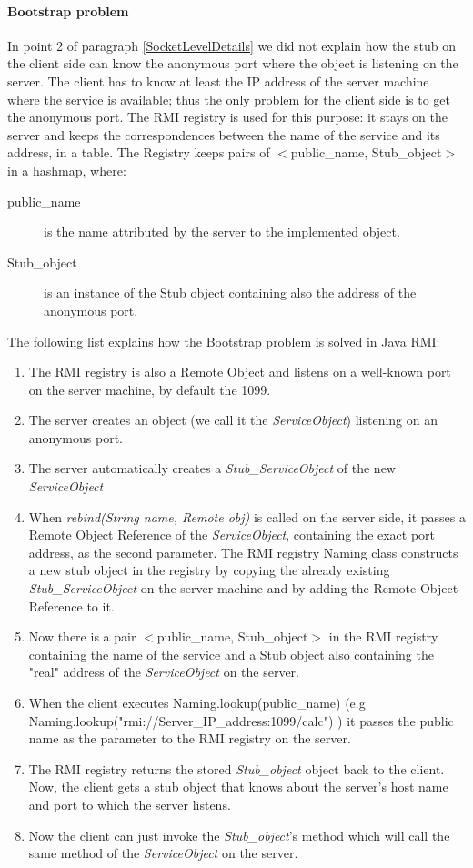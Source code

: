 \paragraph{Bootstrap problem}
\label{BootstrapProblem}
In point 2 of paragraph \ref{SocketLevelDetails} we did not explain how the stub on the client side can know the anonymous port where the object is listening on the server. The client has to know at least the IP address of the server machine where the service is available; thus the only problem for the client side is to get the anonymous port.
The RMI registry is used for this purpose: it stays on the server and keeps the correspondences between the name of the service and its address, in a table.
The Registry keeps pairs of $<$public\_name, Stub\_object$>$ in a hashmap, where:
\begin{description}
\item [public\_name] is the name attributed by the server to the implemented object.
\item [Stub\_object] is an instance of the Stub object containing also the address of the anonymous port. 
\end{description}

The following list explains how the Bootstrap problem is solved in Java RMI:
\begin{enumerate}
\item The RMI registry is also a Remote Object and listens on a well-known port on the server machine, by default the 1099.
\item The server creates an object (we call it the \textit{ServiceObject}) listening on an anonymous port.
\item The server automatically creates a \textit{Stub\_ServiceObject} of the new \textit{ServiceObject}
\item When \textit{rebind(String name, Remote obj)} is called on the server side, it passes a Remote Object Reference of the \textit{ServiceObject}, containing the exact port address, as the second parameter. The RMI registry Naming class constructs a new stub object in the registry by copying the already existing \textit{Stub\_ServiceObject} on the server machine and by adding the Remote Object Reference to it.
\item Now there is a pair $<$public\_name, Stub\_object$>$ in the RMI registry containing the name of the service and a Stub object also containing the "real" address of the \textit{ServiceObject} on the server.
\item When the client executes Naming.lookup(public\_name) (e.g \\ Naming.lookup("rmi://Server\_IP\_address:1099/calc") ) it passes the public name as the parameter to the RMI registry on the server. 
\item The RMI registry returns the stored \textit{Stub\_object} object back to the client. Now, the client gets a stub object that knows about the server's host name and port to which the server listens.
\item Now the client can just invoke the \textit{Stub\_object}'s method which will call the same method of the \textit{ServiceObject} on the server.
\end{enumerate}

